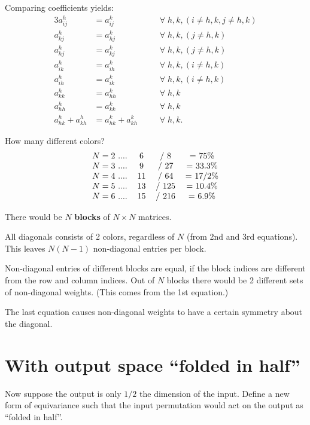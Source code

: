 Comparing coefficients yields:
\begin{alignat}{3}
a_{ij}^h &= a_{ij}^k && \forall \; h,k, (i \neq h,k, j \neq h,k) \nonumber \\
a_{kj}^h &= a_{hj}^k && \forall \; h,k, (j \neq h,k) \nonumber \\
a_{hj}^h &= a_{kj}^k && \forall \; h,k, (j \neq h,k) \nonumber \\
a_{ik}^h &= a_{ih}^k && \forall \; h,k, (i \neq h,k) \nonumber \\
a_{ih}^h &= a_{ik}^k && \forall \; h,k, (i \neq h,k) \nonumber \\
a_{kk}^h &= a_{hh}^k && \forall \; h,k \nonumber \\
a_{hh}^h &= a_{kk}^k && \forall \; h,k \nonumber \\
a_{hk}^h + a_{kh}^h &= a_{hk}^k + a_{kh}^k \quad && \forall \; h,k .
\end{alignat}

How many different colors?
\begin{equation}
\begin{tabular}{c c c c}
$N = 2$ .... & 6 & / 8 & = 75\% \\
$N = 3$ .... & 9 & / 27 & = 33.3\% \\
$N = 4$ .... & 11 & / 64 & = 17/2\% \\
$N = 5$ .... & 13 & / 125 & = 10.4\% \\
$N = 6$ .... & 15 & / 216 & = 6.9\%
\end{tabular}
\end{equation}

There would be $N$ \textbf{blocks} of $N \times N$ matrices.

All diagonals consists of 2 colors, regardless of $N$ (from 2nd and 3rd equations).  This leaves $N (N - 1)$ non-diagonal entries per block.

Non-diagonal entries of different blocks are equal, if the block indices are different from the row and column indices.  Out of $N$ blocks there would be 2 different sets of non-diagonal weights.  (This comes from the 1st equation.)

The last equation causes non-diagonal weights to have a certain symmetry about the diagonal.  

\section{With output space ``folded in half''}

Now suppose the output is only $1/2$ the dimension of the input.  Define a new form of equivariance such that the input permutation would act on the output as ``folded in half''. 

